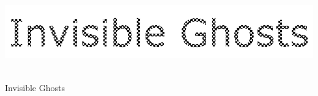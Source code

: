 \documentclass[main.tex]{subfiles}
\begin{document}
    \begin{titlepage}
    
    \newcommand{\HRule}{\rule{\linewidth}{0.5mm}}
    \center 
     
    \includegraphics[width=.7\textwidth]{inv.png}\\[4cm]
    \Huge
    
    { \huge \bfseries \TrainingName}\\

    {\Large Invisible Ghosts}
    
    \vfill 
    \end{titlepage}
\end{document}
